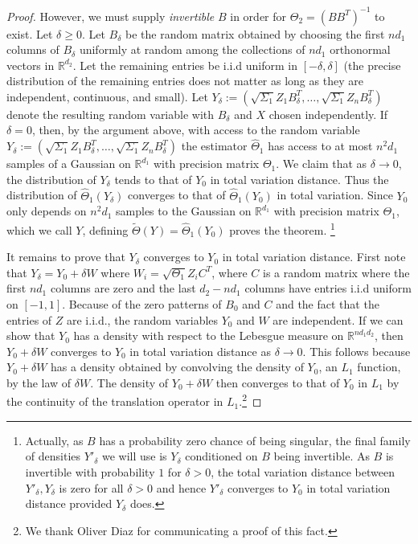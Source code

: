 \documentclass[aos]{imsart}
\theoremstyle{definition}
\numberwithin{equation}{section}
\newcommand{\R}{{\mathbb{R}}}
\begin{document}
\begin{proof}
However, we must supply \emph{invertible} $B$ in order for $\Theta_2 = (BB^T)^{-1}$ to exist.
Let $\delta \geq 0$.
Let $B_\delta$ be the random matrix obtained by choosing the first $nd_1$ columns of $B_\delta$ uniformly at random among the collections of $nd_1$ orthonormal vectors in $\R^{d_2}$.
Let the remaining entries be i.i.d uniform in $[-\delta, \delta]$ (the precise distribution of the remaining entries does not matter as long as they are independent, continuous, and small).
Let $Y_\delta:=(\sqrt{\Sigma_1} Z_1 B_\delta^T, \dots, \sqrt{\Sigma_1} Z_n B_\delta^T)$ denote the resulting random variable with $B_\delta$ and $X$ chosen independently.
If $\delta = 0$, then, by the argument above, with access to the random variable $Y_\delta:=(\sqrt{\Sigma_1} Z_1 B_\delta^T, \dots, \sqrt{\Sigma_1} Z_n B_\delta^T)$ the estimator $\widehat{\Theta}_1$ has access to at most $n^2d_1$ samples of a Gaussian on $\R^{d_1}$ with precision matrix $\Theta_1$.
We claim that as $\delta \to 0$, the distribution of $Y_\delta$ tends to that of $Y_0$ in total variation distance.
Thus the distribution of $\widehat{\Theta}_1(Y_\delta)$ converges to that of $\widehat{\Theta}_1(Y_0)$ in total variation.
Since $Y_0$ only depends on $n^2d_1$ samples to the Gaussian on $\R^{d_1}$ with precision matrix $\Theta_1$, which we call $Y$, defining $\tilde{\Theta}(Y) = \widehat{\Theta}_1(Y_0)$ proves the theorem.
\footnote{Actually, as $B$ has a probability zero chance of being singular, the final family of densities $Y'_\delta$ we will use is $Y_\delta$ conditioned on $B$ being invertible.
As $B$ is invertible with probability $1$ for $\delta > 0$, the total variation distance between $Y'_\delta, Y_\delta$ is zero for all $\delta > 0$ and hence $Y'_\delta$ converges to $Y_0$ in total variation distance provided $Y_\delta$ does.}

It remains to prove that $Y_\delta$ converges to $Y_0$ in total variation distance.
First note that $Y_\delta = Y_0 + \delta W$ where $W_i = \sqrt{\Theta_1} Z_i C^T$, where $C$ is a random matrix where the first $nd_1$ columns are zero and the last $d_2 - n d_1$ columns have entries i.i.d uniform on $[-1, 1]$.
Because of the zero patterns of $B_0$ and $C$ and the fact that the entries of $Z$ are i.i.d., the random variables $Y_0$ and $W$ are independent.
If we can show that $Y_0$ has a density with respect to the Lebesgue measure on $\R^{nd_1d_2}$, then $Y_0 + \delta W$ converges to $Y_0$ in total variation distance as $\delta \to 0$.
This follows because $Y_0 + \delta W$ has a density obtained by convolving the density of $Y_0$, an $L_1$ function, by the law of $\delta W$.
The density of $Y_0 + \delta W$ then converges to that of $Y_0$ in $L_1$ by the continuity of the translation operator in $L_1$.\footnote{We thank Oliver Diaz for communicating a proof of this fact.}


\end{proof}
\end{document}

